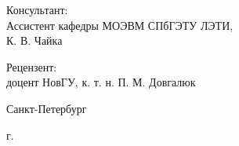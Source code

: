 \begin{titlepage}
\begin{center}
\begin{flushright}
\begin{minipage}[t]{0.65\textwidth}
\vspace{10mm}

{Консультант:} \\
Ассистент кафедры МОЭВМ СПбГЭТУ ЛЭТИ, \\ К. В. Чайка

\vspace{10mm}

{Рецензент:} \\
доцент НовГУ, к. т. н. П. М. Довгалюк
\end{minipage}
\end{flushright}

\vfill

{Санкт-Петербург}
\par{\the\year{} г.}
\end{center}
\end{titlepage}
\restoregeometry
\addtocounter{page}{1}
